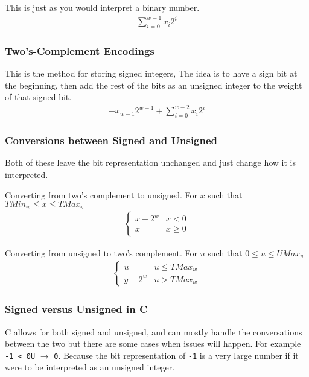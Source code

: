 \documentclass[10pt]{armath}
\newcommand{\s}[1]{\texttt{#1}}
\begin{document}
This is just as you would interpret a binary number.
\begin{align*}
  \sum_{i=0}^{w-1}x_i2^i
\end{align*}

\subsubsection{Two's-Complement Encodings}%
\label{ssub:two_s_complement_encodings}

This is the method for storing signed integers, The idea is to have a sign bit
at the beginning, then add the rest of the bits as an unsigned integer to the
weight of that signed bit.
\begin{align*}
  -x_{w-1}2^{w-1}+\sum_{i=0}^{w-2}x_i2^i
\end{align*}

\subsubsection{Conversions between Signed and Unsigned}%
\label{ssub:conversions_between_signed_and_unsigned}

Both of these leave the bit representation unchanged and just change how it is
interpreted.

Converting from two's complement to unsigned. For $x$ such that $TMin_w\leq
x\leq TMax_w$
\begin{align*}
  \begin{cases}
    x+2^w & x<0\\
    x & x\geq 0
  \end{cases}
\end{align*}

Converting from unsigned to two's complement. For $u$ such that $0\leq u\leq
UMax_w$
\begin{align*}
  \begin{cases}
    u & u \leq TMax_w\\
    y-2^w & u > TMax_w
  \end{cases}
\end{align*}

\subsubsection{Signed versus Unsigned in C}%
\label{ssub:signed_versus_unsigned_in_c}

C allows for both signed and unsigned, and can mostly handle the conversations
between the two but there are some cases when issues will happen. For example
\s{-1 < 0U} $\rightarrow$ \s{0}. Because the bit representation of \s{-1} is a
very large number if it were to be interpreted as an unsigned integer.
\end{document}
